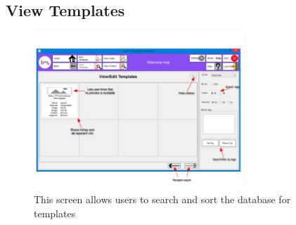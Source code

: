 \documentclass[oneside,openany,11pt,a4paper]{report}
\begin{document}
\subsection{View Templates}
\begin{figure}[H]
	\centering
	\includegraphics[width=0.7\textwidth]{screen/templateviewer.png}
	\caption{This screen allows users to search and sort the database for templates}
\end{figure}
\end{document}
